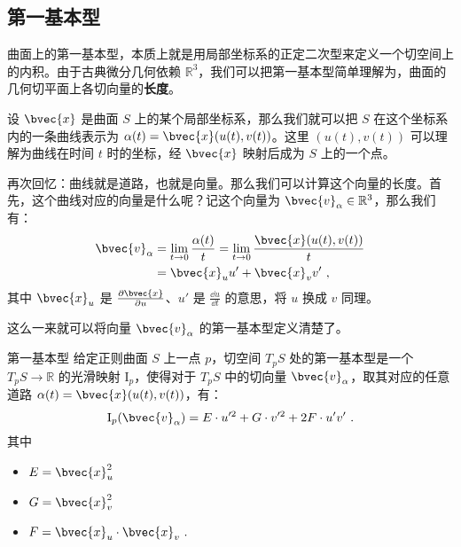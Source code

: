 
\begin{issues}
\issueDraft
\end{issues}


\subsection{第一基本型}

曲面上的第一基本型，本质上就是用局部坐标系的正定二次型来定义一个切空间上的内积。由于古典微分几何依赖 $\mathbb{R}^3$，我们可以把第一基本型简单理解为，曲面的几何切平面上各切向量的\textbf{长度}。

设 $\bvec{x}$ 是曲面 $S$ 上的某个局部坐标系，那么我们就可以把 $S$ 在这个坐标系内的一条曲线表示为 $\alpha(t)=\bvec{x}(u(t), v(t))$。这里 $(u(t), v(t))$ 可以理解为曲线在时间 $t$ 时的坐标，经 $\bvec{x}$ 映射后成为 $S$ 上的一个点。

再次回忆：曲线就是道路，也就是向量。那么我们可以计算这个向量的长度。首先，这个曲线对应的向量是什么呢？记这个向量为 $\bvec{v}_\alpha\in\mathbb{R}^3$，那么我们有：
\begin{equation}
\begin{aligned}
\bvec{v}_\alpha&=\lim\limits_{t\to 0}\frac{\alpha(t)}{t}=\lim\limits_{t\to 0}\frac{\bvec{x}(u(t), v(t))}{t}\\
&=\bvec{x}_uu'+\bvec{x}_vv'~,
\end{aligned}
\end{equation}
其中 $\bvec{x}_u$ 是 $\frac{\partial\bvec{x}}{\partial u}$、$u'$ 是 $\frac{\dd u}{\dd t}$ 的意思，将 $u$ 换成 $v$ 同理。

这么一来就可以将向量 $\bvec{v}_\alpha$ 的第一基本型定义清楚了。

\begin{definition}{第一基本型}\label{def_FForm_1}
给定正则曲面 $S$ 上一点 $p$，切空间 $T_pS$ 处的第一基本型是一个 $T_pS\to \mathbb{R}$ 的光滑映射 $\mathrm{I}_p$，使得对于 $T_pS$ 中的切向量 $\bvec{v}_\alpha$，取其对应的任意道路 $\alpha(t)=\bvec{x}(u(t), v(t))$，有：$$\mathrm{I}_p(\bvec{v}_\alpha)=E\cdot u'^2+G\cdot v'^2+ 2F\cdot u'v'~.$$
其中
\begin{itemize}
\item $E=\bvec{x}_u^2$
\item $G=\bvec{x}_v^2$
\item $F=\bvec{x}_u\cdot\bvec{x}_v~.$
\end{itemize}
\end{definition}

